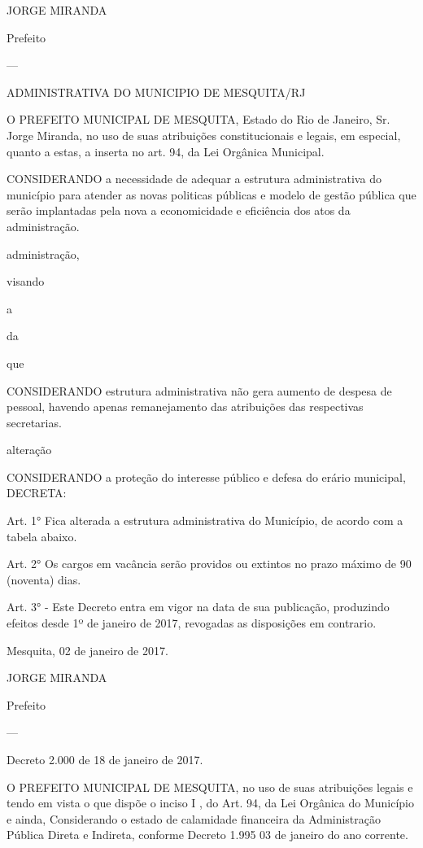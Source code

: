 \documentclass{doliberto}
\begin{document}
 

JORGE MIRANDA 

Prefeito 

---

ADMINISTRATIVA DO MUNICIPIO DE MESQUITA/RJ 

O PREFEITO MUNICIPAL DE MESQUITA, Estado do Rio de 
Janeiro,  Sr.  Jorge  Miranda,  no  uso  de  suas  atribuições 
constitucionais  e  legais,  em  especial,  quanto  a  estas,  a 
inserta no art. 94, da Lei Orgânica Municipal. 

CONSIDERANDO  a  necessidade  de  adequar  a  estrutura 
administrativa  do  município  para  atender  as  novas 
politicas  públicas  e  modelo  de  gestão  pública  que  serão 
implantadas  pela  nova 
a 
economicidade e eficiência dos atos da administração.  

administração, 

visando 

a 

da 

que 

CONSIDERANDO 
estrutura 
administrativa  não  gera  aumento  de  despesa  de  pessoal, 
havendo  apenas  remanejamento  das  atribuições  das 
respectivas secretarias.  

alteração 

CONSIDERANDO  a  proteção  do  interesse  público  e  defesa 
do erário municipal, DECRETA:  

Art.  1°  Fica  alterada  a  estrutura  administrativa  do 
Município, de acordo com a tabela abaixo.  

Art. 2° Os cargos em vacância serão providos ou extintos no 
prazo máximo de 90 (noventa) dias.  

 

Art.  3°  -  Este  Decreto  entra  em  vigor  na  data  de  sua 
publicação, produzindo efeitos desde 1º de janeiro de 2017, 
revogadas as disposições em contrario. 

Mesquita, 02 de janeiro de 2017. 

JORGE MIRANDA  

Prefeito

---

Decreto 2.000 de 18 de janeiro de 2017. 

O  PREFEITO  MUNICIPAL  DE  MESQUITA,  no  uso  de  suas 
atribuições legais e tendo em vista o que dispõe o inciso I , 
do  Art.  94,  da  Lei  Orgânica  do  Município  e  ainda, 
Considerando  o  estado  de  calamidade 
financeira  da 
Administração Pública Direta e Indireta, conforme Decreto 
1.995 03 de janeiro do ano corrente. 
\end{document}
